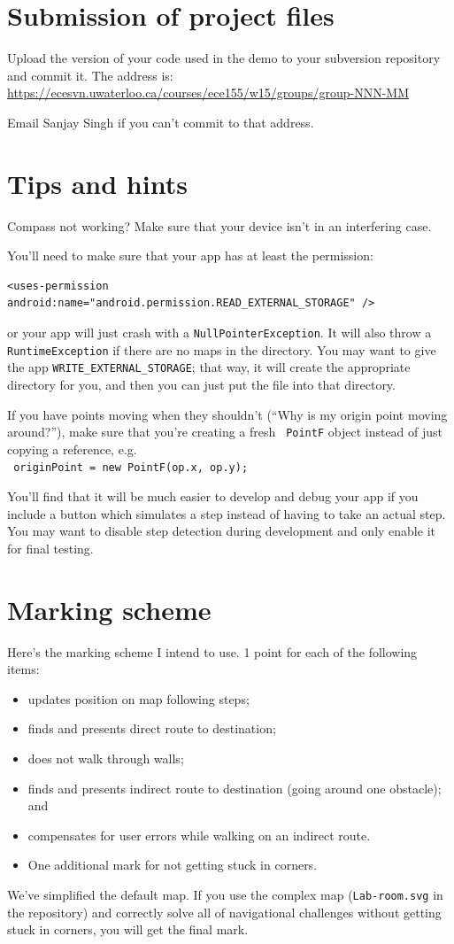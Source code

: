 \documentclass[10pt]{article}
\begin{document}
\section{Submission of project files}

Upload the version of your code used in the demo to your subversion repository and commit it. The address is:
\url{https://ecesvn.uwaterloo.ca/courses/ece155/w15/groups/group-NNN-MM}

Email Sanjay Singh if you can't commit to that address.

\section{Tips and hints} 
Compass not working? Make sure that your device isn't in an interfering case.

You'll need to make sure that your app has at least the permission:
\begin{lstlisting}
<uses-permission android:name="android.permission.READ_EXTERNAL_STORAGE" />
\end{lstlisting}
or your app will just crash with a {\tt NullPointerException}. It will also throw a {\tt RuntimeException} if there are no maps in the directory. You may want
to give the app {\tt WRITE\_EXTERNAL\_STORAGE}; that way, it will create 
the appropriate directory for you, and then you can just put the file into that
directory.

If you have points moving when they shouldn't (``Why is my origin
point moving around?''), make sure that you're creating a fresh {\tt
  PointF} object instead of just copying a reference, e.g.  \\ {\tt
  originPoint = new PointF(op.x, op.y); }



You'll find that it will be much easier to develop and
debug your app if you include a button which simulates a step instead
of having to take an actual step. You may want to disable step
detection during development and only enable it for final testing.

\section{Marking scheme} Here's the marking scheme I intend to use. 1 point for each of the following items:
\begin{itemize}
\item updates position on map following steps;
\item finds and presents direct route to destination;
\item does not walk through walls;
\item finds and presents indirect route to destination (going around one obstacle); and
\item compensates for user errors while walking on an indirect route.
\item One additional mark for not getting stuck in corners.
\end{itemize}
We've simplified the default map. If you
use the complex map ({\tt Lab-room.svg} in the repository)
and correctly solve all of navigational challenges without getting
stuck in corners, you will get the final mark.
\end{document}
